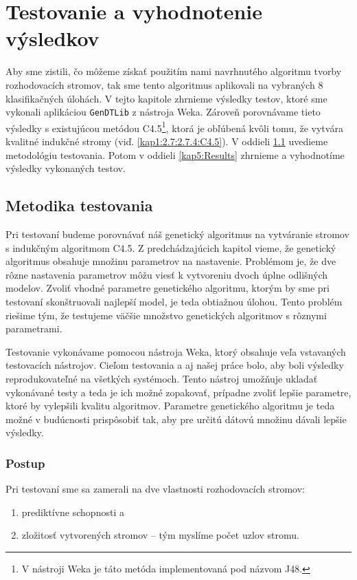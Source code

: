 \chapter{Testovanie a vyhodnotenie výsledkov}\label{kap5:Tests}
Aby sme zistili, čo môžeme získať použitím nami navrhnutého algoritmu tvorby rozhodovacích stromov, tak sme tento algoritmus aplikovali na vybraných 8 klasifikačných úlohách. V tejto kapitole zhrnieme výsledky testov, ktoré sme vykonali aplikáciou \verb|GenDTLib| z nástroja Weka. Zároveň porovnávame tieto výsledky s existujúcou metódou C4.5\footnote{V nástroji Weka je táto metóda implementovaná pod názvom J48.}, ktorá je obľúbená kvôli tomu, že vytvára kvalitné indukčné stromy (viď. \ref{kap1:2.7:2.7.4:C4.5}). V oddieli \ref{kap5:Methodology} uvedieme metodológiu testovania. Potom v oddieli \ref{kap5:Results} zhrnieme a vyhodnotíme výsledky vykonaných testov.
\section{Metodika testovania}\label{kap5:Methodology}
Pri testovaní budeme porovnávať náš genetický algoritmus na vytváranie stromov s indukčným algoritmom C4.5. Z predchádzajúcich kapitol vieme, že genetický algoritmus obsahuje množinu parametrov na nastavenie. Problémom je, že dve rôzne nastavenia parametrov môžu viesť k vytvoreniu dvoch úplne odlišných modelov.
Zvoliť vhodné parametre genetického algoritmu, ktorým by sme pri testovaní skonštruovali najlepší model, je teda obtiažnou úlohou. Tento problém riešime tým, že testujeme väčšie množstvo genetických algoritmov s rôznymi parametrami.

Testovanie vykonávame pomocou nástroja Weka, ktorý obsahuje veľa vstavaných testovacích nástrojov. Cieľom testovania a aj našej práce bolo, aby boli výsledky reprodukovateľné na všetkých systémoch. Tento nástroj umožňuje ukladať vykonávané testy a teda je ich možné zopakovať, prípadne zvoliť lepšie parametre, ktoré by vylepšili kvalitu algoritmov. Parametre genetického algoritmu je teda možné v budúcnosti prispôsobiť tak, aby pre určitú dátovú množinu dávali lepšie výsledky.

\subsection{Postup}
Pri testovaní sme sa zamerali na dve vlastnosti rozhodovacích stromov:
\begin{enumerate}
\item prediktívne schopnosti a
\item zložitosť vytvorených stromov -- tým myslíme počet uzlov stromu.
\end{enumerate}


